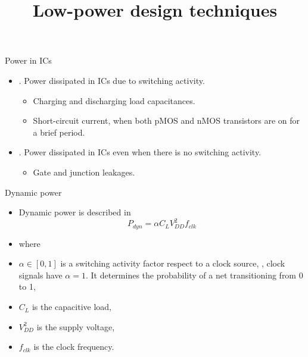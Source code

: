 \documentclass[]{slides}
\title{Low-power design techniques}
\begin{document}
\begin{frame} \titlepage \end{frame}


\begin{frame}{Power in ICs}{}
\begin{itemize}
\item {}. Power dissipated in \acp{IC} due to switching activity.
\begin{itemize}
  \item Charging and discharging load capacitances.
  \item Short-circuit current, when both pMOS and nMOS transistors are on for a brief period.
\end{itemize}
\item {}. Power dissipated in \acp{IC} even when there is no switching activity.
\begin{itemize}
  \item Gate and junction leakages.
\end{itemize}
\end{itemize}
\end{frame}

\begin{frame}{Dynamic power}{}
\begin{itemize}
\item Dynamic power is described in 
\begin{equation}
\label{eq:DynamicPower}
P_{dyn} = \alpha C_{L} V_{DD}^{2} f_{clk}
\end{equation} 
\item[]where
\item[]$\alpha \in [0,1]$ is a switching activity factor respect to a clock source, \ie, clock signals have $\alpha=1$. It determines the probability of a net transitioning from 0 to 1,
\item[]$C_{L}$ is the capacitive load,
\item[]$V_{DD}^{2}$ is the supply voltage,
\item[]$f_{clk}$ is the clock frequency.
\end{itemize}
\end{frame}
\end{document}
